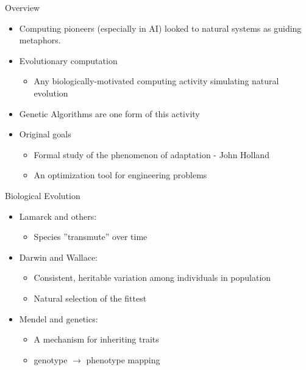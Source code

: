 \documentclass[%
pdf,
colorBG,
slideColor,
tcrico,
]{prosper}
\begin{document}
\begin{slide}{Overview}
\begin{itemize}
\item Computing pioneers (especially in AI) looked to natural systems as guiding metaphors.
\item Evolutionary computation
\begin{itemize}
\item Any biologically-motivated computing activity simulating natural evolution
\end{itemize}
\item Genetic Algorithms are one form of this activity
\item Original goals
\begin{itemize}
\item Formal study of the phenomenon of adaptation - John Holland
\item An optimization tool for engineering problems
\end{itemize}
\end{itemize}
\end{slide}



\begin{slide}{ Biological Evolution}  
\begin{itemize} 
\item Lamarck and others:
\begin{itemize} 
	\item Species ''transmute'' over time 
\end{itemize}
\item Darwin and Wallace:
\begin{itemize} \item Consistent, heritable variation among individuals in population
\item Natural selection of the fittest
\end{itemize}
\item Mendel and genetics:
\begin{itemize} \item A mechanism for inheriting traits
\item genotype $\rightarrow$ phenotype mapping
\end{itemize}
\end{itemize}

\end{slide}
\end{document}
